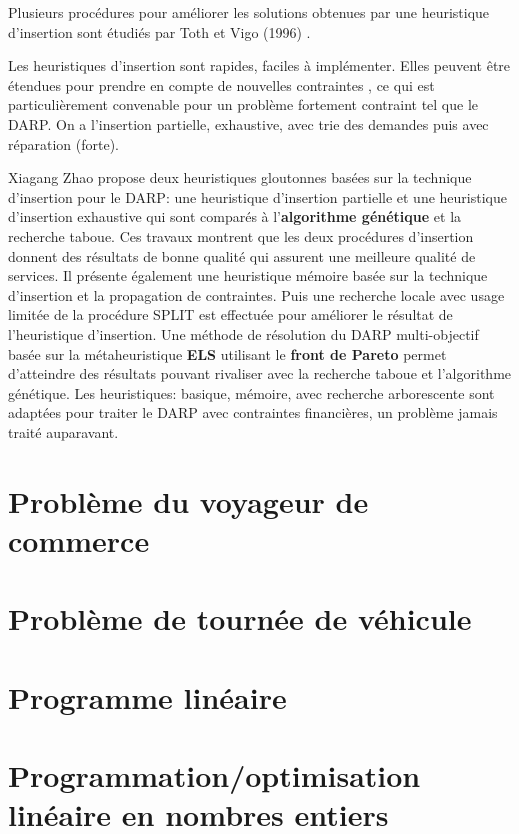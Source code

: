 \documentclass{article}
\begin{document}
	Plusieurs procédures pour améliorer les solutions obtenues par une heuristique d'insertion sont étudiés par Toth et Vigo (1996) \cite{10-116}.
	
	Les  heuristiques d'insertion sont rapides, faciles à implémenter. Elles peuvent être étendues pour prendre en compte de nouvelles contraintes \cite{10-123}, ce qui est particulièrement convenable pour un problème fortement contraint tel que le DARP. On a l'insertion partielle, exhaustive, avec trie des demandes puis avec réparation (forte).

	Xiagang Zhao \cite{13} propose deux heuristiques gloutonnes basées sur la technique d'insertion pour le DARP: une heuristique d'insertion partielle et une heuristique d'insertion exhaustive qui sont comparés à l'\textbf{algorithme génétique} et la recherche taboue. Ces travaux montrent que les deux procédures d'insertion donnent des résultats de bonne qualité qui assurent une meilleure qualité de services. Il présente également une heuristique mémoire basée sur la technique d'insertion et la propagation de contraintes. Puis une recherche locale avec usage limitée de la procédure SPLIT est effectuée pour améliorer le résultat de l'heuristique d'insertion. Une méthode de résolution du DARP multi-objectif basée sur la métaheuristique \textbf{ELS} utilisant le \textbf{front de Pareto} \cite{13} permet d'atteindre des résultats pouvant rivaliser avec la recherche taboue et l'algorithme génétique. Les heuristiques: basique, mémoire, avec recherche arborescente sont adaptées pour traiter le DARP avec contraintes financières, un problème jamais traité auparavant.
\section{Problème du voyageur de commerce}

\section{Problème de tournée de véhicule}

\section{Programme linéaire}

\section{Programmation/optimisation linéaire en nombres entiers}
\end{document}
